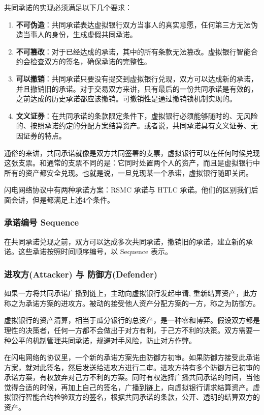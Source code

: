 共同承诺的实现必须满足以下几个要求：

\begin{enumerate}
    \item \textbf{不可伪造}：共同承诺表达虚拟银行双方当事人的真实意愿，任何第三方无法伪造当事人的身份，生成虚假共同承诺。
    \item \textbf{不可篡改}：对于已经达成的承诺，其中的所有条款无法篡改。虚拟银行智能合约会检查双方的签名，确保承诺的完整性。
    \item \textbf{可以撤销}：共同承诺只要没有提交到虚拟银行兑现，双方可以达成新的承诺，并且撤销旧的承诺。对于交易双方来讲，只有最后的一份共同承诺是有效的，之前达成的历史承诺都应该撤销。可撤销性是通过撤销锁机制实现的。
    \item \textbf{文义证券}：在共同承诺的条款限定条件下，虚拟银行必须能够随时的、无风险的、按照承诺约定的分配方案结算资产。或者说，共同承诺具有文义证券、无因证券的特点。
\end{enumerate}

通俗的来讲，共同承诺就像是双方共同签署的支票，虚拟银行可以在任何时候兑现这张支票。和通常的支票不同的是：它同时处置两个人的资产，而且是虚拟银行中所有的资产都安全兑现。也就是说，一旦兑现某一个承诺，虚拟银行随即关闭。

闪电网络协议中有两种承诺方案：RSMC 承诺与 HTLC 承诺。他们的区别我们后面会讲，但是都满足上述4个条件。

\subsubsection{承诺编号 Sequence}
在共同承诺兑现之前，双方可以达成多次共同承诺，撤销旧的承诺，建立新的承诺。这些承诺按照时间顺序编号，以 Sequence 表示。


\subsubsection{进攻方(Attacker) 与 防御方(Defender)}
如果一方将共同承诺广播到链上，主动向虚拟银行发起申请, 重新结算资产，此方称之为承诺方案的进攻方。被动的接受他人资产分配方案的一方，称之为防御方。

虚拟银行的资产清算，相当于瓜分银行的总资产，是一种零和博弈。假设双方都是理性的决策者，任何一方都不会做出于对方有利，于己方不利的决策。双方需要一种公平的机制管理共同承诺，规避对手风险，防止对方作弊。

在闪电网络的协议里，一个新的承诺方案先由防御方初审。如果防御方接受此承诺方案，就对此签名，然后发送给进攻方进行二审。进攻方持有多个防御方已初审的承诺方案，有权放弃对己方不利的方案。同时有权选择广播共同承诺的时间，当他觉得合适的时候，再加上自己的签名，广播到链上，向虚拟银行请求结算资产。虚拟银行智能合约检验双方的签名，根据共同承诺的条款，公开、透明的结算双方的资产。

